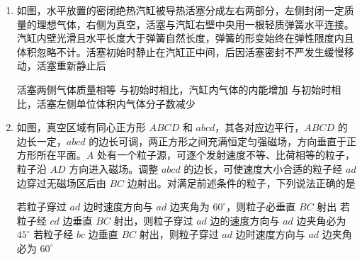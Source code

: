 \documentclass[\gkver]{gaokaozhenti}
\begin{document}
\begin{enumerate}
{故选 BD。
}

\item
如图，水平放置的密闭绝热汽缸被导热活塞分成左右两部分，左侧封闭一定质量的理想气体，右侧为真空，活塞与汽缸右壁中央用一根轻质弹簧水平连接。汽缸内壁光滑且水平长度大于弹簧自然长度，弹簧的形变始终在弹性限度内且体积忽略不计。活塞初始时静止在汽缸正中间，后因活塞密封不严发生缓慢移动，活塞重新静止后


{活塞两侧气体质量相等}
{与初始时相比，汽缸内气体的内能增加}
{与初始时相比，活塞左侧单位体积内气体分子数减少}


\item
如图，真空区域有同心正方形 $ABCD$ 和 $abcd$，其各对应边平行，$ABCD$ 的边长一定，$abcd$ 的边长可调，两正方形之间充满恒定匀强磁场，方向垂直于正方形所在平面。$A$ 处有一个粒子源，可逐个发射速度不等、比荷相等的粒子，粒子沿 $AD$ 方向进入磁场。调整 $abcd$ 的边长，可使速度大小合适的粒子经 $ad$ 边穿过无磁场区后由 $BC$ 边射出。对满足前述条件的粒子，下列说法正确的是


{若粒子穿过 $ad$ 边时速度方向与 $ad$ 边夹角为 $60^\circ$，则粒子必垂直 $BC$ 射出}
{若粒子经 $cd$ 边垂直 $BC$ 射出，则粒子穿过 $ad$ 边的速度方向与 $ad$ 边夹角必为 $45^\circ$}
{若粒子经 $bc$ 边垂直 $BC$ 射出，则粒子穿过 $ad$ 边时速度方向与 $ad$ 边夹角必为 $60^\circ$}


\end{enumerate}
\end{document}
